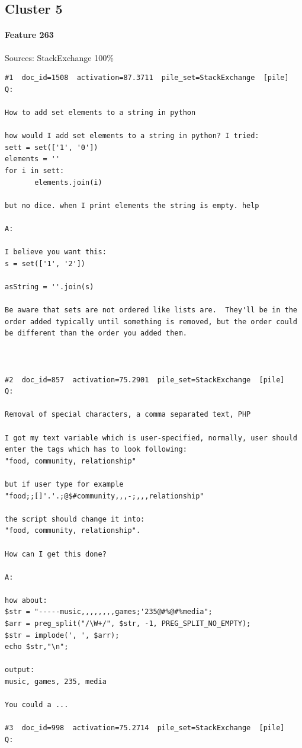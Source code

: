 \subsection*{Cluster 5}

\paragraph*{Feature 263} Sources: StackExchange 100\%

\begin{verbatim}
#1  doc_id=1508  activation=87.3711  pile_set=StackExchange  [pile]
Q:

How to add set elements to a string in python

how would I add set elements to a string in python? I tried:
sett = set(['1', '0'])
elements = ''
for i in sett:
       elements.join(i)

but no dice. when I print elements the string is empty. help

A:

I believe you want this:
s = set(['1', '2'])

asString = ''.join(s)

Be aware that sets are not ordered like lists are.  They'll be in the order added typically until something is removed, but the order could be different than the order you added them.



#2  doc_id=857  activation=75.2901  pile_set=StackExchange  [pile]
Q:

Removal of special characters, a comma separated text, PHP

I got my text variable which is user-specified, normally, user should enter the tags which has to look following: 
"food, community, relationship"

but if user type for example 
"food;;[]'.'.;@$#community,,,-;,,,relationship"

the script should change it into: 
"food, community, relationship".

How can I get this done?

A:

how about:
$str = "-----music,,,,,,,,games;'235@#%@#%media";
$arr = preg_split("/\W+/", $str, -1, PREG_SPLIT_NO_EMPTY);
$str = implode(', ', $arr);
echo $str,"\n";

output:
music, games, 235, media

You could a ...

#3  doc_id=998  activation=75.2714  pile_set=StackExchange  [pile]
Q:


\end{verbatim}
